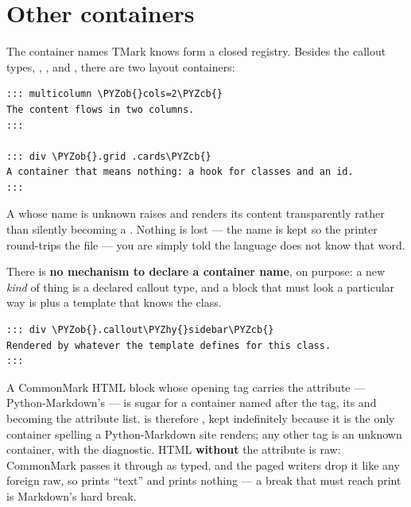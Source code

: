 \documentclass[a4paper,twoside]{article}
\begin{document}
\section{Other containers}
The container names TMark knows form a closed registry. Besides the callout
types, , ,  and , there are two layout containers:
\begin{tscode}[lang=md, engine=pygments]
\begin{Verbatim}[commandchars=\\\{\},breaklines, breakanywhere, commandchars=\\\{\}]
::: multicolumn \PYZob{}cols=2\PYZcb{}
The content flows in two columns.
:::

::: div \PYZob{}.grid .cards\PYZcb{}
A container that means nothing: a hook for classes and an id.
:::
\end{Verbatim}
\end{tscode}
A  whose name is unknown raises  and renders its
content transparently rather than silently becoming a . Nothing is lost
--- the name is kept so the printer round-trips the file --- you are simply told
the language does not know that word.

There is \textbf{no mechanism to declare a container name}, on purpose: a new \emph{kind}
of thing is a declared callout type, and a block that must look a particular
way is  plus a template that knows the class.
\begin{tscode}[lang=md, engine=pygments]
\begin{Verbatim}[commandchars=\\\{\},breaklines, breakanywhere, commandchars=\\\{\}]
::: div \PYZob{}.callout\PYZhy{}sidebar\PYZcb{}
Rendered by whatever the template defines for this class.
:::
\end{Verbatim}
\end{tscode}
A CommonMark HTML block whose opening tag carries the  attribute ---
Python-Markdown's  --- is sugar for a container named after the tag,
its  and  becoming the attribute list.  is therefore
, kept indefinitely because it is the only container spelling a
Python-Markdown site renders; any other tag is an unknown container, with the
diagnostic. HTML \textbf{without} the attribute is raw: CommonMark passes it through
as typed, and the paged writers drop it like any foreign raw, so
 prints \enquote{text} and  prints nothing --- a break
that must reach print is Markdown's hard break.
\end{document}

